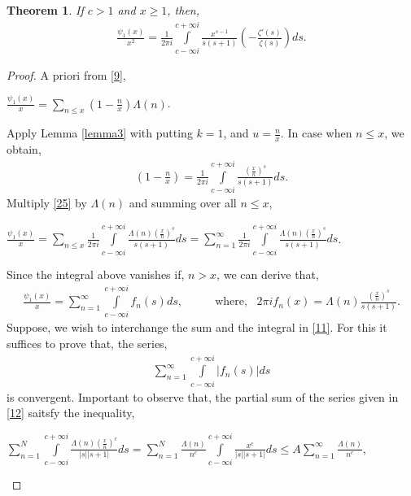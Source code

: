 \documentclass[article,12pt]{elsarticle}
\newtheorem{thm}{Theorem}[section]
\begin{document}
	\begin{thm}\label{thm8}
		If $c>1$ and $x\geq 1$, then,
		\begin{eqnarray}\label{10}
			\frac{\psi_{1}(x)}{x^{2}}=\frac{1}{2\pi i}\int\limits_{c-\infty i}^{c+\infty i}\frac{x^{s-1}}{s(s+1)}( -\frac{\zeta'(s)}{\zeta(s)})	ds.
		\end{eqnarray}
	\end{thm}
	\begin{proof}
		A priori from \eqref{9},
		\begin{center}
			$\frac{\psi_{1}(x)}{x}=\sum\limits_{n\leq x} (1-\frac{n}{x})\Lambda(n)$.
		\end{center}
		Apply Lemma \eqref{lemma3} with putting $k=1$, and $u=\frac{n}{x}$. In case when $n\leq x $, we obtain,
		\begin{align} \label{25}
			(1-\frac{n}{x})=\frac{1}{2\pi i}\int\limits_{c-\infty i}^{c+\infty i}\frac{(\frac{x}{n})^{s}}{s(s+1)}ds.
		\end{align}
		Multiply \eqref{25} by $\Lambda(n)$ and summing over all $n\leq x$,
		\begin{center}
			$\frac{\psi_{1}(x)}{x}=\sum\limits_{n\leq x}\frac{1}{2\pi i}\int\limits_{c-\infty i}^{c+\infty i}\frac{\Lambda(n)(\frac{x}{n})^{s}}{s(s+1)}ds=\sum\limits_{n=1}^{\infty}\frac{1}{2\pi i}\int\limits_{c-\infty i}^{c+\infty i}\frac{\Lambda(n)(\frac{x}{n})^{s}}{s(s+1)}ds$.
		\end{center}	
		Since the integral above vanishes if, $n>x$, we can derive that,
		\begin{eqnarray}\label{11}
			\frac{\psi_{1}(x)}{x}=\sum\limits_{n=1}^{\infty}\int\limits_{c-\infty i}^{c+\infty i}f_{n}(s)ds,\hspace{20pt}
			&\mbox{ where,} \hspace{10pt} 2\pi if_{n}(x)=\Lambda(n)\frac{(\frac{x}{n})^{s}}{s(s+1)}.
		\end{eqnarray}
		Suppose, we wish to interchange the sum and the integral in \eqref{11}. For this it suffices to prove that, the series,
		\begin{eqnarray}\label{12}
			\sum\limits_{n=1}^{\infty}\int\limits_{c-\infty i}^{c+\infty i}|f_{n}(s)|ds
		\end{eqnarray}
		is convergent. Important to observe that, the partial sum of the series given in \eqref{12} saitsfy the inequality,
		\begin{center}
			$	\sum\limits_{n=1}^{N}\int\limits_{c-\infty i}^{c+\infty i}\frac{\Lambda(n)(\frac{x}{n})^{c}}{|s||s+1|}ds=\sum\limits_{n=1}^{N}\frac{\Lambda(n)}{n^{c}}\int\limits_{c-\infty i}^{c+\infty i}\frac{x^{c}}{|s||s+1|}ds\leq A\sum\limits_{n=1}^{\infty}\frac{\Lambda(n)}{n^{c}}$,

\end{center}
\end{proof}
\end{document}
